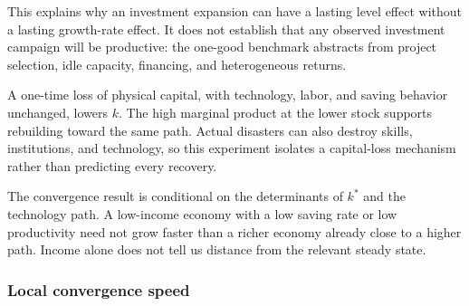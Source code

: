This explains why an investment expansion can have a lasting level effect
without a lasting growth-rate effect. It does not establish that any observed
investment campaign will be productive: the one-good benchmark abstracts from
project selection, idle capacity, financing, and heterogeneous returns.

A one-time loss of physical capital, with technology, labor, and saving behavior
unchanged, lowers $k$. The high marginal product at the lower stock supports
rebuilding toward the same path. Actual disasters can also destroy skills,
institutions, and technology, so this experiment isolates a capital-loss
mechanism rather than predicting every recovery.

The convergence result is conditional on the determinants of $k^*$ and the
technology path. A low-income economy with a low saving rate or low productivity
need not grow faster than a richer economy already close to a higher path.
Income alone does not tell us distance from the relevant steady state.

\subsubsection{Local convergence speed}

